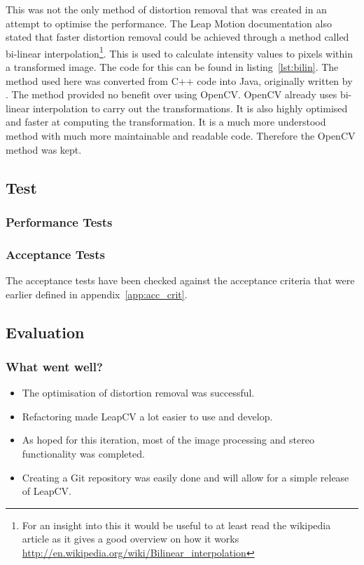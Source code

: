 \documentclass[11pt,oneside]{report}
\begin{document}
			This was not the only method of distortion removal that was created in an attempt to optimise the performance.
			The Leap Motion documentation also stated that faster distortion removal could be achieved through a method called bi-linear interpolation\footnote{For an insight into this it would be useful to at least read the wikipedia article as it gives a good overview on how it works \url{http://en.wikipedia.org/wiki/Bilinear_interpolation}}.
			This is used to calculate intensity values to pixels within a transformed image.
			The code for this can be found in listing~\ref{lst:bilin}.
			The method used here was converted from C++ code into Java, originally written by .
			The method provided no benefit over using OpenCV.
			OpenCV already uses bi-linear interpolation to carry out the transformations.
			It is also highly optimised and faster at computing the transformation.
			It is a much more understood method with much more maintainable and readable code.
			Therefore the OpenCV method was kept.		
			\clearpage
			
			\clearpage
		\subsection{Test}
			\subsubsection{Performance Tests}
			
			
			\subsubsection{Acceptance Tests}
			The acceptance tests have been checked against the acceptance criteria that were earlier defined in appendix~\ref{app:acc_crit}.
			
		\subsection{Evaluation}
			\subsubsection{What went well?}
			\begin{itemize}
				\item The optimisation of distortion removal was successful.
				\item Refactoring made LeapCV a lot easier to use and develop.
				\item As hoped for this iteration, most of the image processing and stereo functionality was completed.
				\item Creating a Git repository was easily done and will allow for a simple release of LeapCV.
			\end{itemize}
\end{document}
